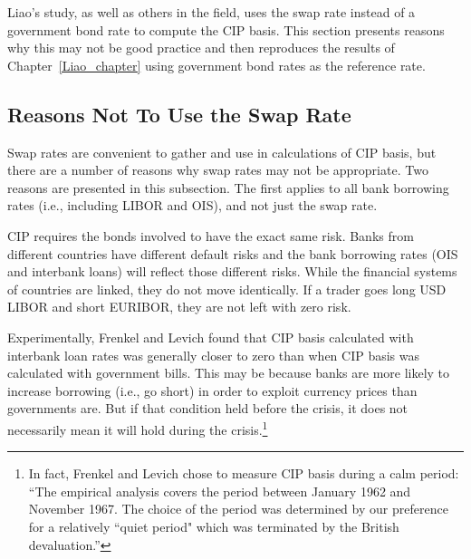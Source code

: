 Liao's study, as well as others in the field, uses the swap rate instead of a government bond rate to compute the CIP basis.  This section presents reasons why this may not be good practice and then reproduces the results of Chapter~\ref{Liao_chapter} using government bond rates as the reference rate.

\subsection{Reasons Not To Use the Swap Rate} \label{not_swap_subsection}


Swap rates are convenient to gather and use in calculations of CIP basis, but there are a number of reasons why swap rates may not be appropriate.  Two reasons are presented in this subsection.  The first applies to all bank borrowing rates (i.e., including LIBOR and OIS), and not just the swap rate.  


CIP requires the bonds involved to have the exact same risk.  Banks from different countries have different default risks and the bank borrowing rates (OIS and interbank loans) will reflect those different risks.  While the financial systems of countries are linked, they do not move identically.  If a trader goes long USD LIBOR and short EURIBOR, they are not left with zero risk. 


Experimentally, Frenkel and Levich\cite{Frenkel1975} found that CIP basis calculated with interbank loan rates was generally closer to zero than when CIP basis was calculated with government bills.  This may be because banks are more likely to increase borrowing (i.e., go short) in order to exploit currency prices than governments are.  But if that condition held before the crisis, it does not necessarily mean it will hold during the crisis.\footnote{In fact, Frenkel and Levich chose to measure CIP basis during a calm period: ``The empirical analysis covers the period between January 1962 and November 1967. The choice of the period was determined by our preference for a relatively ``quiet period" which was terminated by the British devaluation.''\cite{Frenkel1975}}


